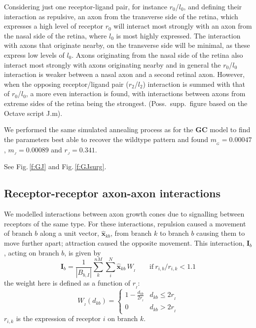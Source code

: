 \documentclass[11pt, a4paper, draft]{article}
\begin{document}
Considering just one receptor-ligand pair, for instance $r_0$/$l_0$, and
defining their interaction as repulsive, an axon from the transverse side of
the retina, which expresses a high level of receptor $r_0$ will interact most
strongly with an axon from the nasal side of the retina, where $l_0$ is most
highly expressed. The interaction with axons that originate nearby, on the
transverse side will be minimal, as these express low levels of $l_0$. Axons
originating from the nasal side of the retina also interact most strongly with
axons originating nearby and in general the $r_0$/$l_0$ interaction is weaker
between a nasal axon and a second retinal axon. However, when the opposing
receptor/ligand pair ($r_2$/$l_2$) interaction is summed with that of
$r_0$/$l_0$, a more even interaction is found, with interactions between axons
from extreme sides of the retina being the strongest. (Poss.~supp.~figure
based on the Octave script J.m).

We performed the same simulated annealing process as for the
$\mathbf{GC}$ model to find the parameters best able to recover the wildtype
pattern and found $m_{\!_G} = 0.00047$, $m_{\!_J} = 0.00089$ and $r_{\!_J} =
0.341$.

See Fig.\,\ref{f:GJ} and Fig.\,\ref{f:GJsurg}.

\subsection*{Receptor-receptor axon-axon interactions}

We modelled interactions between axon growth cones due to signalling between
receptors of the same type. For these interactions, repulsion caused a
movement of branch $b$ along a unit vector, $\hat{\mathbf{x}}_{kb}$, from
branch $k$ to branch $b$ causing them to move further apart; attraction caused
the opposite movement. This interaction, $\mathbf{I}_b$, acting on branch $b$,
is given by
%
\begin{equation}
\mathbf{I}_b
= \frac{1}{|B_{b,I}|} \sum_k^{nM} \sum_i^N \hat{\mathbf{x}}_{kb}\,W_{\!_I} \qquad \mathrm{if}~r_{i,b}
/ r_{i,k} < 1.1
\end{equation}
%
the weight here is defined as a function of $r_{\!_I}$:
%
\begin{equation}
W_{\!_I}(d_{kb}) = \begin{cases}
      1 - \frac{d_{kb}}{2r_{\!_I}}   & d_{kb} \leq 2r_{\!_I} \\
     0 & d_{kb} > 2r_{\!_I}
     \end{cases}
\end{equation}
$r_{i,k}$ is the expression of receptor $i$ on branch $k$.
\end{document}
